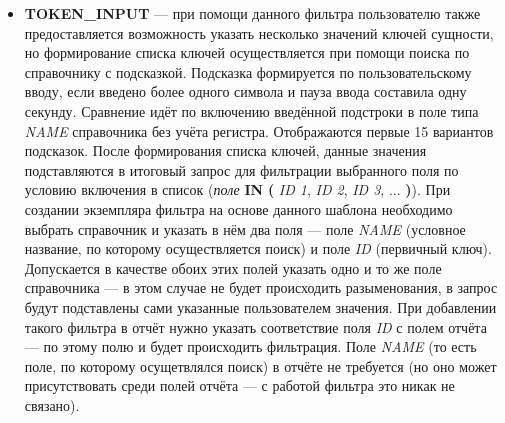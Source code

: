 \documentclass[../user-manual.tex]{subfiles}
\begin{document}
\begin{itemize}
		\item \textbf{TOKEN\_INPUT} --- при помощи данного фильтра пользователю также предоставляется возможность указать несколько значений ключей сущности, но формирование списка ключей осуществляется при помощи поиска по справочнику с подсказкой. Подсказка формируется по пользовательскому вводу, если введено более одного символа и пауза ввода составила одну секунду. Сравнение идёт по включению введённой подстроки в поле типа \textit{NAME} справочника без учёта регистра. Отображаются первые 15 вариантов подсказок. После формирования списка ключей, данные значения подставляются в итоговый запрос для фильтрации выбранного поля по условию включения в список (\textit{поле} \textbf{IN} \textbf{(} \textit{ ID 1}, \textit{ID 2}, \textit{ID 3}, ... \textbf{)}). При создании экземпляра фильтра на основе данного шаблона необходимо выбрать справочник и указать в нём два поля --- поле \textit{NAME} (условное название, по которому осуществляется поиск) и поле \textit{ID} (первичный ключ). Допускается в качестве обоих этих полей указать одно и то же поле справочника --- в этом случае не будет происходить разыменования, в запрос будут подставлены сами указанные пользователем значения. При добавлении такого фильтра в отчёт нужно указать соответствие поля \textit{ID} с полем отчёта --- по этому полю и будет происходить фильтрация. Поле \textit{NAME} (то есть поле, по которому осущетвлялся поиск) в отчёте не требуется (но оно может присутствовать среди полей отчёта --- с работой фильтра это никак не связано).
		

\end{itemize}
\end{document}

